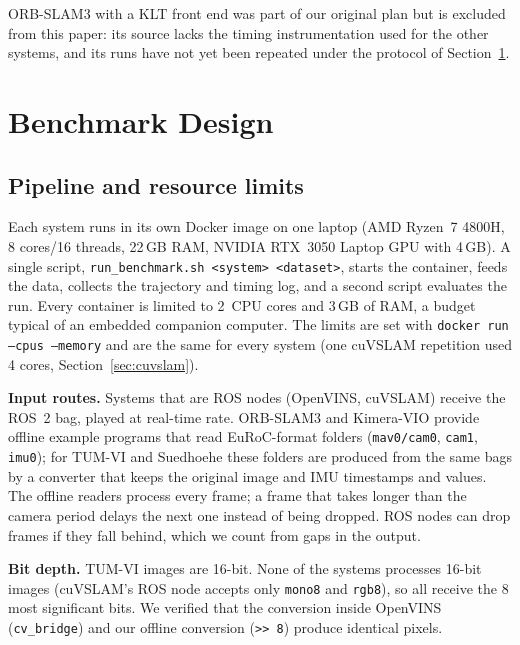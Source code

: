 \documentclass[conference,a4paper]{IEEEtran}
\newcommand{\sued}{Suedhoehe}
\begin{document}
ORB-SLAM3 with a KLT front end was part of our original plan but is excluded from this paper:
its source lacks the timing instrumentation used for the other systems, and its runs have not yet
been repeated under the protocol of Section~\ref{sec:method}.

\section{Benchmark Design}
\label{sec:method}

\subsection{Pipeline and resource limits}

Each system runs in its own Docker image on one laptop (AMD Ryzen~7 4800H, 8 cores/16 threads,
22\,GB RAM, NVIDIA RTX~3050 Laptop GPU with 4\,GB). A single script,
\texttt{run\_benchmark.sh <system> <dataset>}, starts the container, feeds the data, collects the
trajectory and timing log, and a second script evaluates the run. Every container is limited to
2~CPU cores and 3\,GB of RAM, a budget typical of an embedded companion computer. The limits are
set with \texttt{docker run --cpus --memory} and are the same for every system (one cuVSLAM
repetition used 4 cores, Section~\ref{sec:cuvslam}).

\textbf{Input routes.} Systems that are ROS nodes (OpenVINS, cuVSLAM) receive the ROS~2 bag,
played at real-time rate. ORB-SLAM3 and Kimera-VIO provide offline example programs that read
EuRoC-format folders (\texttt{mav0/cam0}, \texttt{cam1}, \texttt{imu0}); for TUM-VI and
\sued{} these folders are produced from the same bags by a converter that keeps the original
image and IMU timestamps and values. The offline readers process every frame; a frame that takes
longer than the camera period delays the next one instead of being dropped. ROS nodes can drop
frames if they fall behind, which we count from gaps in the output.

\textbf{Bit depth.} TUM-VI images are 16-bit. None of the systems processes 16-bit images
(cuVSLAM's ROS node accepts only \texttt{mono8} and \texttt{rgb8}), so all receive the 8 most
significant bits. We verified that the conversion inside OpenVINS (\texttt{cv\_bridge}) and our
offline conversion (\texttt{>{}>~8}) produce identical pixels.
\end{document}
